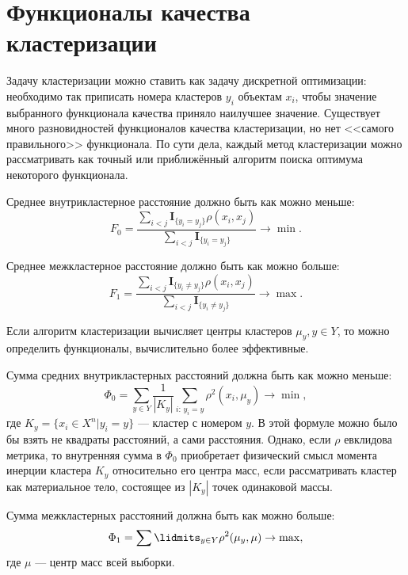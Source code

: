 \documentclass[article, 10pt]{disser}
\begin{document}
\section{Функционалы качества кластеризации}
Задачу кластеризации можно ставить как задачу дискретной оптимизации: необходимо так приписать номера кластеров $y_i$ объектам $x_i$, чтобы значение выбранного функционала качества приняло наилучшее значение. Существует много разновидностей функционалов качества кластеризации, но нет <<самого правильного>> функционала. По сути дела, каждый метод кластеризации можно рассматривать как точный или приближённый алгоритм поиска оптимума некоторого функционала.

Среднее внутрикластерное расстояние должно быть как можно меньше:
\begin{equation*}
    F_0 = \frac{\sum_{i < j}\mathbf{I}_{\{y_i = y_j\}}\rho(x_i, x_j)}{\sum_{i < j}\mathbf{I}_{\{y_i = y_j\}}} \rightarrow \min.
\end{equation*}

Среднее межкластерное расстояние должно быть как можно больше:
\begin{equation*}
    F_1 = \frac{\sum_{i < j}\mathbf{I}_{\{y_i \neq y_j\}}\rho(x_i, x_j)}{\sum_{i < j}\mathbf{I}_{\{y_i \neq y_j\}}} \rightarrow \max.
\end{equation*}

Если алгоритм кластеризации вычисляет центры кластеров $\mu_y, y \in Y$, то можно определить функционалы, вычислительно более эффективные.

Сумма средних внутрикластерных расстояний должна быть как можно меньше:
\begin{equation*}
    \Phi_0 =  \sum\limits_{y \in Y}\frac{1}{|K_y|}\sum\limits_{i:\,y_i=y}\rho^2(x_i, \mu_y)\rightarrow \min,
\end{equation*}
где $K_y = \{x_i \in X^{n}| y_i = y\}$ --- кластер с номером $y$. В этой формуле можно было бы взять не квадраты расстояний, а сами расстояния. Однако, если $\rho$ евклидова метрика, то внутренняя сумма в $\Phi_0$ приобретает физический смысл момента инерции кластера $K_y$ относительно его центра масс, если рассматривать кластер как материальное тело, состоящее из $|K_y|$ точек одинаковой массы.

Сумма межкластерных расстояний должна быть как можно больше:
\begin{equation*}
    \Phi_1 =  \sum\lidmits_{y \in Y}\rho^2(\mu_y, \mu)\rightarrow \max,
\end{equation*}
где $\mu$ --- центр масс всей выборки.
\end{document}
